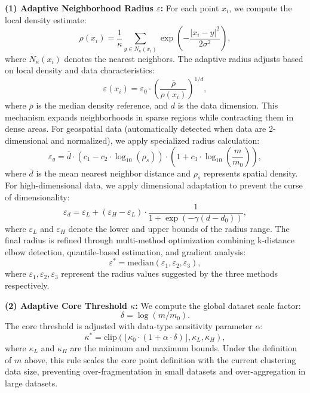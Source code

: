 \documentclass[preprint,12pt,authoryear]{elsarticle}
\theoremstyle{definition}
\begin{document}
\textbf{(1) Adaptive Neighborhood Radius $\varepsilon$:} For each point $x_i$, we compute the local density estimate:
\begin{equation}
\rho(x_i) = \frac{1}{\kappa} \sum_{y \in N_\kappa(x_i)} \exp\left(-\frac{|x_i - y|^2}{2\sigma^2}\right),
\label{e1}
\end{equation}
where $N_\kappa(x_i)$ denotes the nearest neighbors. The adaptive radius adjusts based on local density and data characteristics:
\begin{equation}
\varepsilon(x_i) = \varepsilon_0 \cdot \left(\frac{\bar{\rho}}{\rho(x_i)}\right)^{1/d},
\end{equation}
where $\bar{\rho}$ is the median density reference, and $d$ is the data dimension. This mechanism expands neighborhoods in sparse regions while contracting them in dense areas. 
For geospatial data (automatically detected when data are 2-dimensional and normalized), we apply specialized radius calculation:
\begin{equation}
\varepsilon_g = \bar{d} \cdot (c_1 - c_2 \cdot \log_{10}(\rho_s)) \cdot \left(1 + c_3 \cdot 
\log_{10}\left(\frac{m}{m_0}\right)\right),
\end{equation}
where $\bar{d}$ is the mean nearest neighbor distance and $\rho_s$ represents spatial density. For high-dimensional data, we apply dimensional adaptation to prevent the curse of dimensionality:
\begin{equation}
\varepsilon_d = \varepsilon_L + (\varepsilon_H - \varepsilon_L) \cdot \frac{1}{1 + \exp(-\gamma(d - d_0))},
\end{equation}
where $\varepsilon_L$ and $\varepsilon_H$ denote the lower and upper bounds of the radius range. The final radius is refined through multi-method optimization combining k-distance elbow detection, quantile-based estimation, and gradient analysis:
\begin{equation}
\varepsilon^* = \text{median}(\varepsilon_1, \varepsilon_2, \varepsilon_3),
\label{e2}
\end{equation}
where $\varepsilon_1, \varepsilon_2, \varepsilon_3$ represent the radius values suggested by the three methods respectively.

\vspace{.1 in}

\textbf{(2) Adaptive Core Threshold $\kappa$:} We compute the global dataset scale factor:
\begin{equation}
\delta = \log(m/m_0).
\label{e3}
\end{equation}
The core threshold is adjusted with data-type sensitivity parameter $\alpha$:
\begin{equation}
\kappa^* = \text{clip}(\lfloor \kappa_0 \cdot (1 + \alpha \cdot \delta) \rfloor, \kappa_L, \kappa_H),
\label{e4}
\end{equation}
\noindent where $\kappa_L$ and $\kappa_H$ are the minimum and maximum bounds. Under the definition of $m$ above, this rule scales the core point definition with the current clustering data size, preventing over-fragmentation in small datasets and over-aggregation in large datasets.
\vspace{.1 in}
\end{document}
